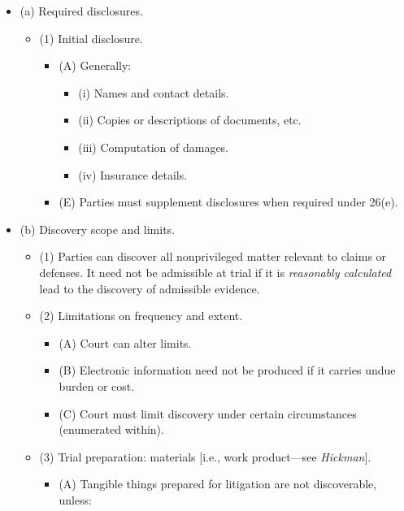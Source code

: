 \begin{itemize}
    \item (a) Required disclosures.
    \begin{itemize}
        \item (1) Initial disclosure.
        \begin{itemize}
            \item (A) Generally:
            \begin{itemize}
                \item (i) Names and contact details.
                \item (ii) Copies or descriptions of documents, etc.
                \item (iii) Computation of damages.
                \item (iv) Insurance details.
            \end{itemize}
            \item (E) Parties must supplement disclosures when required under 
            26(e).
        \end{itemize}
    \end{itemize}
    \item (b) Discovery scope and limits.
    \begin{itemize}
        \item (1) Parties can discover all nonprivileged matter relevant to 
        claims or defenses. It need not be admissible at trial if it is 
        \emph{reasonably calculated} lead to the discovery of admissible 
        evidence.
        \item (2) Limitations on frequency and extent.
        \begin{itemize}
            \item (A) Court can alter limits.
            \item (B) Electronic information need not be produced if it 
            carries undue burden or cost.
            \item (C) Court must limit discovery under certain circumstances 
            (enumerated within).
        \end{itemize}
        \item (3) Trial preparation: materials [i.e., work product---see 
        \emph{Hickman}].
        \begin{itemize}
            \item (A) Tangible things prepared for litigation are not 
            discoverable, unless:
            \begin{itemize}

\end{itemize}
\end{itemize}
\end{itemize}
\end{itemize}
